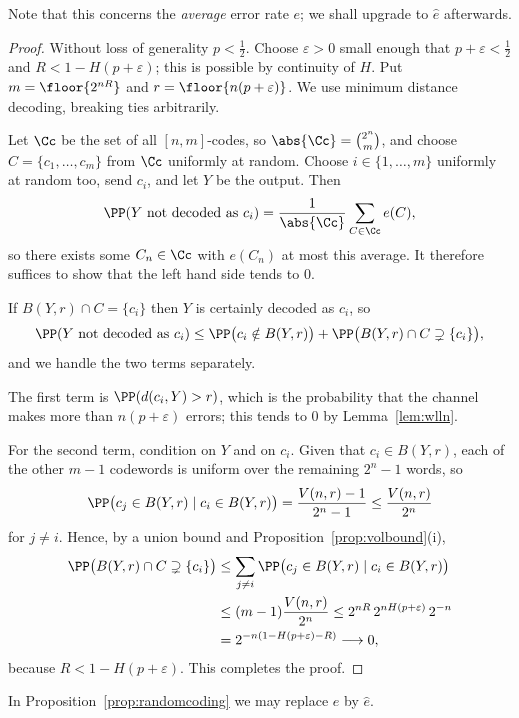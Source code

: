 Note that this concerns the \emph{average} error rate $e$; we shall upgrade to $\hat e$ afterwards.

\begin{proof}
	Without loss of generality $p< \tfrac12$. Choose $\varepsilon>0$ small enough that $p+\varepsilon<\tfrac12$ and $R < 1-H(p+\varepsilon)$; this is possible by continuity of $H$. Put $m = \floor{2^{nR}}$ and $r = \floor{n(p+\varepsilon)}$. We use minimum distance decoding, breaking ties arbitrarily.

	Let $\Cc$ be the set of all $[n,m]$-codes, so $\abs{\Cc} = \binom{2^n}{m}$, and choose $C = \{c_1,\dots,c_m\}$ from $\Cc$ uniformly at random. Choose $i \in \{1,\dots,m\}$ uniformly at random too, send $c_i$, and let $Y$ be the output. Then
	$$\PP(Y \text{ not decoded as } c_i) = \frac{1}{\abs{\Cc}}\sum_{C \in \Cc} e(C),$$
	so there exists some $C_n \in \Cc$ with $e(C_n)$ at most this average. It therefore suffices to show that the left hand side tends to $0$.

	If $B(Y,r)\cap C = \{c_i\}$ then $Y$ is certainly decoded as $c_i$, so
	$$\PP(Y\text{ not decoded as }c_i) \le \PP\bigl(c_i \notin B(Y,r)\bigr) + \PP\bigl(B(Y,r)\cap C \supsetneq \{c_i\}\bigr),$$
	and we handle the two terms separately.

	The first term is $\PP(d(c_i,Y)>r)$, which is the probability that the channel makes more than $n(p+\varepsilon)$ errors; this tends to $0$ by Lemma~\ref{lem:wlln}.

	For the second term, condition on $Y$ and on $c_i$. Given that $c_i \in B(Y,r)$, each of the other $m-1$ codewords is uniform over the remaining $2^n - 1$ words, so
	$$\PP\bigl(c_j \in B(Y,r)\mid c_i \in B(Y,r)\bigr) = \frac{V(n,r)-1}{2^n-1}\le \frac{V(n,r)}{2^n}$$
	for $j \ne i$. Hence, by a union bound and Proposition~\ref{prop:volbound}(i),
	\begin{align*}
		\PP\bigl(B(Y,r)\cap C \supsetneq \{c_i\}\bigr) &\le \sum_{j\ne i}\PP\bigl(c_j\in B(Y,r)\mid c_i \in B(Y,r)\bigr)\\
		&\le (m-1)\frac{V(n,r)}{2^n} \le 2^{nR}\,2^{nH(p+\varepsilon)}\,2^{-n}\\
		&= 2^{-n\left(1-H(p+\varepsilon)-R\right)} \longrightarrow 0,
	\end{align*}
	because $R < 1-H(p+\varepsilon)$. This completes the proof.
\end{proof}

\begin{proposition}
	In Proposition~\ref{prop:randomcoding} we may replace $e$ by $\hat e$.
\end{proposition}


